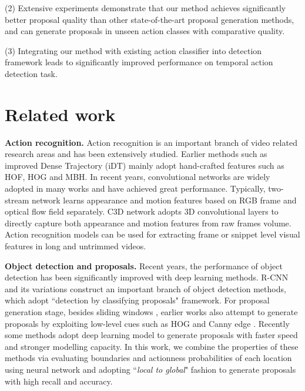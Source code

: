 \documentclass[runningheads]{llncs}
\begin{document}
(2) Extensive experiments demonstrate that our method achieves significantly better proposal quality than other state-of-the-art proposal generation methods, and can generate proposals in unseen action classes with comparative quality.

(3) Integrating our method with existing action classifier into detection framework leads to significantly improved performance on temporal action detection task.

\vspace{-0.1cm}

\section{Related work}

\noindent
{\bf Action recognition.}
Action recognition is an important branch of video related research areas and has been extensively studied. Earlier methods such as improved Dense Trajectory (iDT) \cite{dtf,wang2013action} mainly adopt hand-crafted features such as HOF, HOG and MBH. In recent years, convolutional networks are widely adopted in many works \cite{feichtenhofer2016convolutional,simonyan2014two,tran2015learning,wang2015towards} and have achieved great performance. Typically, two-stream network \cite{feichtenhofer2016convolutional,simonyan2014two,wang2015towards} learns appearance and motion features based on RGB frame and optical flow field separately. C3D network \cite{tran2015learning} adopts 3D convolutional layers to directly capture both appearance and motion features from raw frames volume.
Action recognition models can be used for extracting frame or snippet level visual features in long and untrimmed videos.


\noindent
{\bf Object detection and proposals.}
Recent years, the performance of object detection has been significantly improved with deep learning methods. R-CNN \cite{girshick2014rich} and its variations \cite{girshick2015fastt,ren2015faster} construct an important branch of object detection methods, which adopt ``detection by classifying proposals" framework.
For proposal generation stage, besides sliding windows \cite{felzenszwalb2010object}, earlier works also attempt to generate proposals by exploiting low-level cues such as HOG and Canny edge \cite{uijlings2013selective,zitnick2014edge}. Recently some methods \cite{ren2015faster,kuo2015deepbox,lin2016feature} adopt deep learning model to generate proposals with faster speed  and stronger modelling capacity.
In this work, we combine the properties of these methods via evaluating boundaries and actionness probabilities of each location using neural network and adopting ``\emph{local to global}" fashion to generate proposals with high recall and accuracy.
\end{document}
